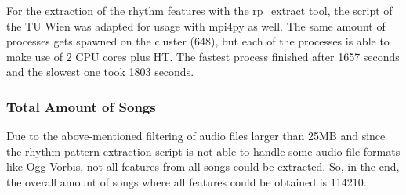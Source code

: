 \noindent For the extraction of the rhythm features with the rp\_extract tool, the script of the TU Wien was adapted for usage with mpi4py as well. The same amount of processes gets spawned on the cluster (648), but each of the processes is able to make use of 2 CPU cores plus HT. The fastest process finished after 1657 seconds and the slowest one took 1803 seconds.

\subsubsection{Total Amount of Songs}\label{totamsong}

Due to the above-mentioned filtering of audio files larger than 25MB and since the rhythm pattern extraction script is not able to handle some audio file formats like Ogg Vorbis, not all features from all songs could be extracted. So, in the end, the overall amount of songs where all features could be obtained is 114210.\\



